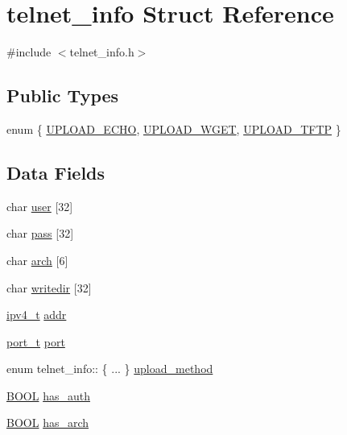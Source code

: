\hypertarget{structtelnet__info}{}\section{telnet\+\_\+info Struct Reference}
\label{structtelnet__info}


{\ttfamily \#include $<$telnet\+\_\+info.\+h$>$}

\subsection*{Public Types}
\begin{DoxyCompactItemize}
\item 
enum \{ \hyperlink{structtelnet__info_a99fb83031ce9923c84392b4e92f956b5a0e8828185a008fa30a4190e91f27f5af}{U\+P\+L\+O\+A\+D\+\_\+\+E\+C\+HO}, 
\hyperlink{structtelnet__info_a99fb83031ce9923c84392b4e92f956b5a93510f2ee840724df98f77b4b8309dad}{U\+P\+L\+O\+A\+D\+\_\+\+W\+G\+ET}, 
\hyperlink{structtelnet__info_a99fb83031ce9923c84392b4e92f956b5ac082301202f86e5286ee047bdcb41760}{U\+P\+L\+O\+A\+D\+\_\+\+T\+F\+TP}
 \}
\end{DoxyCompactItemize}
\subsection*{Data Fields}
\begin{DoxyCompactItemize}
\item 
char \hyperlink{structtelnet__info_ab34a32fb3324f0fc33c8d7d44c46ebf9}{user} \mbox{[}32\mbox{]}
\item 
char \hyperlink{structtelnet__info_ade137af880b61e4c68fb2dcc274dd1c0}{pass} \mbox{[}32\mbox{]}
\item 
char \hyperlink{structtelnet__info_a51de8a8ff4eea181532ea93a70052c48}{arch} \mbox{[}6\mbox{]}
\item 
char \hyperlink{structtelnet__info_a1386e9a3d64a2f0d4e04206b8929f679}{writedir} \mbox{[}32\mbox{]}
\item 
\hyperlink{loader_2src_2headers_2includes_8h_aaadf2e480fd246ff9e932039b223baed}{ipv4\+\_\+t} \hyperlink{structtelnet__info_a587426ea8fb6d0cbb271fa3abee2219c}{addr}
\item 
\hyperlink{loader_2src_2headers_2includes_8h_adccb5337cf206fe3eca7c4732f634bb9}{port\+\_\+t} \hyperlink{structtelnet__info_ac9ee24e988b48236762f815b201bed8a}{port}
\item 
enum telnet\+\_\+info\+:: \{ ... \}  \hyperlink{structtelnet__info_aec0c66f6602f002f54e80b170f60a817}{upload\+\_\+method}
\item 
\hyperlink{loader_2src_2headers_2includes_8h_af492d2bddcb2befacb3aa03dcdf9aafd}{B\+O\+OL} \hyperlink{structtelnet__info_ae0863d08adfe65fe9d51053657cfd74c}{has\+\_\+auth}
\item 
\hyperlink{loader_2src_2headers_2includes_8h_af492d2bddcb2befacb3aa03dcdf9aafd}{B\+O\+OL} \hyperlink{structtelnet__info_a22cbf698e4cc8d9469ba39cdd8fd94de}{has\+\_\+arch}
\end{DoxyCompactItemize}



